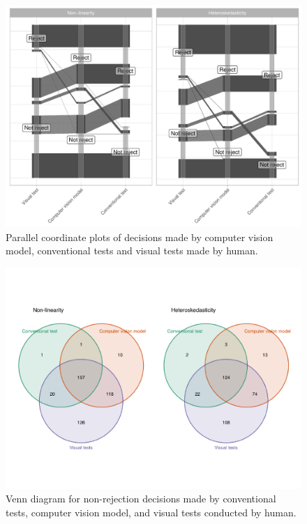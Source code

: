 \documentclass[]{interact}
\theoremstyle{plain}%
\theoremstyle{definition}
\theoremstyle{remark}
\begin{document}
\begin{figure}

{\centering \includegraphics[width=1\linewidth]{paper_files/figure-latex/pcp-1} 

}

\caption{Parallel coordinate plots of decisions made by computer vision model, conventional tests and visual tests made by human.}\label{fig:pcp}
\end{figure}

\begin{figure}[!h]

{\centering \includegraphics[width=1\linewidth]{paper_files/figure-latex/venn-1} 

}

\caption{Venn diagram for non-rejection decisions made by conventional tests, computer vision model, and visual tests conducted by human.}\label{fig:venn}
\end{figure}
\end{document}
